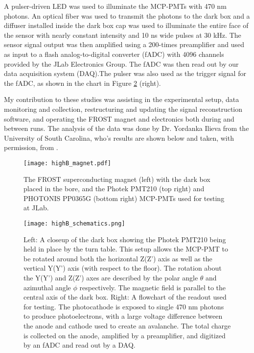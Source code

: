 A pulser-driven LED was used to illuminate the MCP-PMTs with 470 nm photons. An optical fiber was used to transmit the photons to the dark box and a diffuser installed inside the dark box cap was used to illuminate the entire face of the sensor with nearly constant intensity and 10 ns wide pulses at 30 kHz. The sensor signal output was then amplified using a 200-times preamplifier and used as input to a flash analog-to-digital converter (fADC) with 4096 channels provided by the JLab Electronics Group. The fADC was then read out by our data acquisition system (DAQ).The pulser was also used as the trigger signal for the fADC, as shown in the chart in Figure \ref{fig:highB_schematics} (right).

My contribution to these studies was assisting in the experimental setup, data monitoring and collection, restructuring and updating the signal reconstruction software, and operating the FROST magnet and electronics both during and between runs. The analysis of the data was done by Dr. Yordanka Ilieva from the University of South Carolina, who's results are shown below and taken, with permission, from \cite{HighB_DIRC2015}.


\begin{figure}[!htb]
	\centering
	\texttt{[image: highB\_magnet.pdf]}
	\caption{The FROST superconducting magnet (left) with the dark box placed in the bore, and the Photek PMT210 (top right) and PHOTONIS PP0365G (bottom right) MCP-PMTs used for testing at JLab.}
	\label{fig:highB_magnet}
\end{figure}

\begin{figure}[!htb]
	\centering
	\texttt{[image: highB\_schematics.png]}
	\caption{Left: A closeup of the dark box showing the Photek PMT210 being held in place by the turn table. This setup allows the MCP-PMT to be rotated around both the horizontal Z(Z') axis as well as the vertical Y(Y') axis (with respect to the floor). The rotation about the Y(Y') and Z(Z') axes are described by the polar angle $\theta$ and azimuthal angle $\phi$ respectively. The magnetic field is parallel to the central axis of the dark box. Right: A flowchart of the readout used for testing. The photocathode is exposed to single 470 nm photons to produce photoelectrons, with a large voltage difference between the anode and cathode used to create an avalanche. The total charge is collected on the anode, amplified by a preamplifier, and digitized by an fADC and read out by a DAQ. \cite{HighB_DIRC2015} }
	\label{fig:highB_schematics}
\end{figure}

